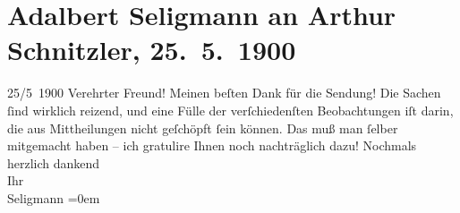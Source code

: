 

         
         \renewcommand{\erwaehntePersonen}{Personen: Adalbert Franz Seligmann}
         \renewcommand{\erwaehnteOrte}{Orte: Wien}
         \renewcommand{\erwaehnteWerke}{Werke: Reigen. Zehn Dialoge}
               \section[Adalbert Seligmann an Arthur Schnitzler, 25. 5. 1900]{ Adalbert Seligmann an Arthur Schnitzler, 25. 5. 1900}\nopagebreak{}\rehead{ }\begin{ledgroupsized}[t]{13cm}\normalsize\beginnumbering \toendnotes[C]{\smallbreak\pagebreak[2]} 
\toendnotes[C]{\smallbreak}\pstart
           \raggedleft{}{\pb}25/5 1900\pend
           \pstart
           Verehrter Freund! Meinen beſten Dank für die Sendung! Die Sachen ſind wirklich reizend,
               und eine Fülle der verſchiedenſten Beobachtungen iſt darin, die aus Mittheilungen
               nicht geſchöpft ſein können. Das muß man ſelber mitgemacht haben – ich gratulire
               Ihnen noch nachträglich dazu!\pend
           \pstart
           Nochmals herzlich dankend{\\[\baselineskip]}Ihr{\\[\baselineskip]}\spacefill\mbox{Seligmann}\pend
           \leftskip=0em{}
         
         \endnumbering{}\end{ledgroupsized}  \newcommand{\dateiname}{L01040}\newcommand{\titel}{Adalbert Seligmann an Arthur Schnitzler, 25. 5. 1900}\newcommand{\editorInnen}{Martin Anton Müller und Gerd-Hermann Susen}
      